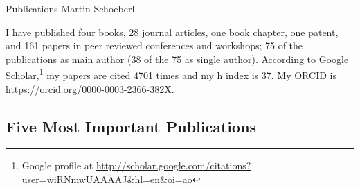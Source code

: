 \documentclass[%
    a4paper,
    11pt, %
    headinclude, footexclude,
    notitlepage,
    headsepline,
    pointlessnumbers,
    ]{scrartcl}
\begin{document}
\pagestyle{scrheadings}

\begin{center}
\vspace{3cm}
{\huge Publications Martin Schoeberl}\\
\bigskip
\bigskip
\end{center}

I have published four books, 28 journal articles, one book chapter, one patent, and 161
papers in peer reviewed conferences and workshops; 75 of the publications
as main author (38 of the 75 as single author).
According to Google Scholar,\footnote{Google profile at
\url{http://scholar.google.com/citations?user=wiRNmwUAAAAJ&hl=en&oi=ao}
}
my papers are cited 4701 times and my h index is 37.
My ORCID is \url{https://orcid.org/0000-0003-2366-382X}.

\subsection*{Five Most Important Publications}
\end{document}
